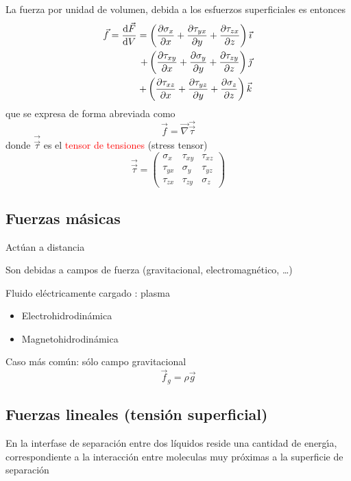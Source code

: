 La fuerza por unidad de volumen, debida a los esfuerzos superficiales es entonces
\begin{eqnarray*}
	\vec f = \frac{\textrm{d} \vec F}{\textrm{d} V} = \left( \frac{\partial \sigma_x}{\partial x} + \frac{\partial \tau_{yx}}{\partial y} + \frac{\partial \tau_{zx}}{\partial z}\right) \vec \imath \\
	+ \left( \frac{\partial \tau_{xy}}{\partial x} + \frac{\partial \sigma_y}{\partial y} +  \frac{\partial \tau_{zy}}{\partial z} \right) \vec \jmath \\
	+ \left( \frac{\partial \tau_{xz}}{\partial x}  +  \frac{\partial \tau_{yz}}{\partial y} + \frac{\partial \sigma_z}{\partial z} \right) \vec k
\end{eqnarray*}
que se expresa de forma abreviada como
\begin{equation}
	 \vec f = \vec \nabla \vec {\vec \tau}
\end{equation}
donde $\vec {\vec \tau}$ es el \textcolor{red}{tensor de tensiones} (stress tensor)
\begin{equation}
	\vec{\vec{\tau}} =
	\left(
	\begin{array}{ccc}
		\sigma_x & \tau_{xy} & \tau_{xz} \\
		\tau_{yx} & \sigma_y & \tau_{yz} \\
		\tau_{zx} & \tau_{zy} & \sigma_z
	\end{array}\right)
\end{equation}

\subsection{Fuerzas m\'asicas}
Act\'uan a distancia

Son debidas a campos de fuerza (gravitacional, electromagn\'etico, \ldots)

Fluido el\'ectricamente cargado : plasma
\begin{itemize}
	\item Electrohidrodin\'amica
	\item Magnetohidrodin\'amica
\end{itemize}

Caso m\'as com\'un: s\'olo campo gravitacional
$$\vec f_g = \rho \vec g$$

\subsection{Fuerzas lineales (tensi\'on superficial)}
En la interfase de separaci\'on entre dos l\'iquidos reside una cantidad de energ\'{\i}a, correspondiente
a la interacci\'on entre moleculas muy pr\'oximas a la superficie de separaci\'on


